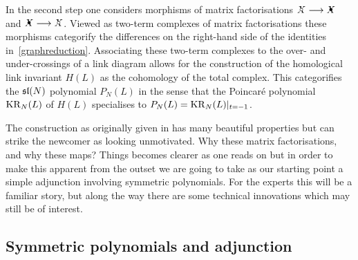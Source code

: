 \documentclass{compositio}
\theoremstyle{definition}
\numberwithin{equation}{section}
\begin{document}
In the second step one considers morphisms of matrix factorisations $\Xcirc \lto \Xbul$ and $\Xbul \lto \Xcirc$. Viewed as two-term complexes of matrix factorisations these morphisms categorify the differences on the right-hand side of the identities in~\eqref{graphreduction}. Associating these two-term complexes to the over- and under-crossings of a link diagram allows for the construction of the homological link invariant $H(L)$ as the cohomology of the total complex. This categorifies the $\mathfrak{sl}(N)$ polynomial $P_{N}(L)$ in the sense that the Poincar\'e polynomial $\operatorname{KR}_{N}(L)$ of $H(L)$ specialises to $P_{N}(L)=\operatorname{KR}_{N}(L)|_{t=-1}$. 

The construction as originally given in \cite{kr0401268} has many beautiful properties but can strike the newcomer as looking unmotivated. Why these matrix factorisations, and why these maps? Things becomes clearer as one reads on \cite{k0510265,RouquierMexico} but in order to make this apparent from the outset we are going to take as our starting point a simple adjunction involving symmetric polynomials. For the experts this will be a familiar story, but along the way there are some technical innovations which may still be of interest.


\subsection{Symmetric polynomials and adjunction}
\end{document}
